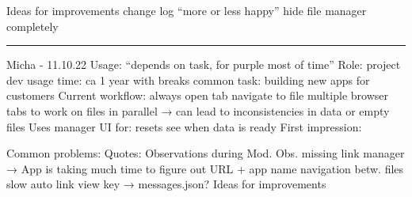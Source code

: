 Ideas for improvements
change log
“more or less happy”
hide file manager completely
\hrule
Micha - 11.10.22
Usage: “depends on task, for purple most of time”
Role: project dev
usage time: ca 1 year with breaks
common task: 
building new apps for customers
Current workflow:
always open tab
navigate to file
multiple browser tabs to work on files in parallel → can lead to inconsistencies in data or empty files
Uses manager UI for:
resets
see when data is ready
First impression:


Common problems:
Quotes:
Observations during Mod. Obs.
missing link manager → App is taking much time to figure out URL + app name
navigation betw. files slow
auto link view key → messages.json?
Ideas for improvements
